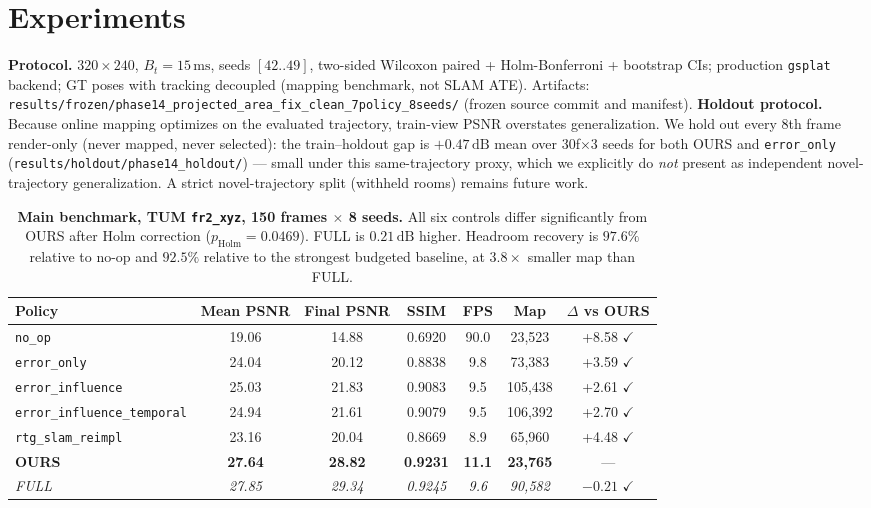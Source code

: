 \documentclass[10pt,twocolumn,letterpaper]{article}
\begin{document}
\section{Experiments}
\label{sec:experiments}
\textbf{Protocol.} $320 \times 240$, $B_t = 15\,\mathrm{ms}$, seeds $[42..49]$, two-sided Wilcoxon paired + Holm-Bonferroni + bootstrap CIs; production \texttt{gsplat} backend; GT poses with tracking decoupled (mapping benchmark, not SLAM ATE).
Artifacts: \texttt{results/frozen/phase14\_projected\_area\_fix\_clean\_7policy\_8seeds/} (frozen source commit and manifest).
\textbf{Holdout protocol.} Because online mapping optimizes on the evaluated trajectory, train-view PSNR overstates generalization. We hold out every 8th frame render-only (never mapped, never selected): the train--holdout gap is $+0.47\,\mathrm{dB}$ mean over 30f$\times$3 seeds for both OURS and \texttt{error\_only} (\texttt{results/holdout/phase14\_holdout/}) --- small under this same-trajectory proxy, which we explicitly do \textit{not} present as independent novel-trajectory generalization. A strict novel-trajectory split (withheld rooms) remains future work.

\begin{table}[t]
\centering
\small
\begin{tabular}{lcccccc}
\toprule
\textbf{Policy} & \textbf{Mean PSNR} & \textbf{Final PSNR} & \textbf{SSIM} & \textbf{FPS} & \textbf{Map} & \textbf{$\Delta$ vs OURS} \\
\midrule
\texttt{no\_op} & 19.06 & 14.88 & 0.6920 & 90.0 & 23,523 & +8.58 $\checkmark$ \\
\texttt{error\_only} & 24.04 & 20.12 & 0.8838 & 9.8 & 73,383 & +3.59 $\checkmark$ \\
\texttt{error\_influence} & 25.03 & 21.83 & 0.9083 & 9.5 & 105,438 & +2.61 $\checkmark$ \\
\texttt{error\_influence\_temporal} & 24.94 & 21.61 & 0.9079 & 9.5 & 106,392 & +2.70 $\checkmark$ \\
\texttt{rtg\_slam\_reimpl} & 23.16 & 20.04 & 0.8669 & 8.9 & 65,960 & +4.48 $\checkmark$ \\
\textbf{OURS} & \textbf{27.64} & \textbf{28.82} & \textbf{0.9231} & \textbf{11.1} & \textbf{23,765} & --- \\
\textit{FULL} & \textit{27.85} & \textit{29.34} & \textit{0.9245} & \textit{9.6} & \textit{90,582} & $-0.21$ $\checkmark$ \\
\bottomrule
\end{tabular}
\caption{\textbf{Main benchmark, TUM \texttt{fr2\_xyz}, 150 frames $\times$ 8 seeds.} All six controls differ significantly from OURS after Holm correction ($p_{\mathrm{Holm}} = 0.0469$). FULL is $0.21\,\mathrm{dB}$ higher. Headroom recovery is $97.6\%$ relative to no-op and $92.5\%$ relative to the strongest budgeted baseline, at $3.8\times$ smaller map than FULL.}
\label{tab:main}
\end{table}
\end{document}
